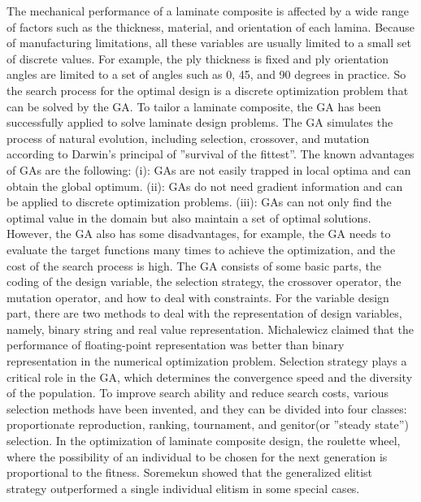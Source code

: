 \documentclass[USenglish]{article}
\begin{document}
The mechanical performance of a laminate composite is affected by a wide range of factors such as the
thickness, material, and orientation of each lamina. Because of manufacturing limitations, all these
variables are usually limited to a small set of discrete values. For example, the ply thickness is fixed
and ply orientation angles are limited to a set of angles such as 0, 45, and 90 degrees in practice. So
the search process for the optimal design is a discrete optimization problem that can be solved by the
GA. To tailor a laminate composite, the GA has been successfully applied to solve laminate design
problems\cite{riche1993optimization,nagendra1996improved,sadagopan1998application,todoroki1998stacking,liu2000permutation,sivakumar1998optimum,walker2003technique,lin2004stacking,kang2005minimum,murugan2007target,akbulut2008optimum}.
The GA simulates the process of natural evolution, including selection, crossover, and mutation
according to Darwin's principal of ''survival of the fittest''. The known advantages of GAs are the
following: (i): GAs are not easily trapped in local optima and can obtain the global
optimum. (ii): GAs do not need gradient information and can be applied to discrete optimization
problems. (iii): GAs can not only find the optimal value in the domain but also maintain a
set of optimal solutions. However, the GA also has some disadvantages, for example, the GA
needs to evaluate the target functions many times to achieve the optimization, and the cost of the
search process is high. The GA consists of some basic parts, the coding of the design variable,
the selection strategy, the crossover operator, the mutation operator, and how to deal with constraints. For the
variable design part, there are two methods to deal with the representation of design variables, namely,
binary string and real value representation\cite{riche1993optimization,todoroki1998stacking}.
Michalewicz\cite{zbigniew1996genetic} claimed that the performance of floating-point representation was
better than binary representation in the numerical optimization problem. Selection strategy plays a
critical role in the GA, which determines the convergence speed and the diversity of the population. To
improve search ability and reduce search costs, various selection methods have been invented, and they
can be divided into four classes: proportionate reproduction, ranking, tournament, and
genitor(or ''steady state'') selection. In the optimization of laminate composite design, the roulette
wheel\cite{riche1993optimization,seresta2007optimal}, where the possibility of an individual to be
chosen for the next generation is proportional to the fitness.
Soremekun\cite{soremekun2001composite} showed that the generalized elitist strategy outperformed a
single individual elitism in some special cases.
\end{document}
